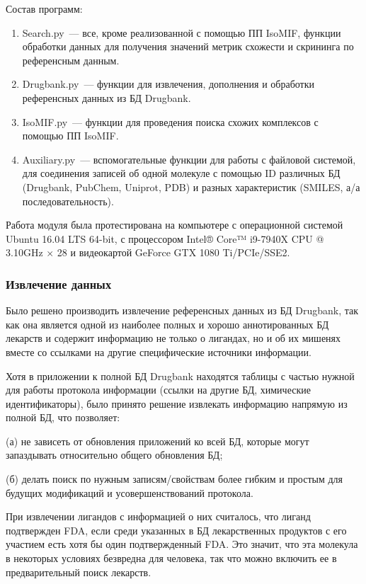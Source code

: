 \documentclass[a4paper,14pt]{article}         %
\begin{document}
Состав программ:
\begin{enumerate}
	\item Search.py~--- все, кроме реализованной с помощью ПП IsoMIF, функции обработки данных для получения значений метрик схожести и скрининга по референсным данным.
	\item Drugbank.py~--- функции для извлечения, дополнения и обработки референсных данных из БД Drugbank.
	\item IsoMIF.py~--- функции для проведения поиска схожих комплексов с помощью ПП IsoMIF.
	\item Auxiliary.py~--- вспомогательные функции для работы с файловой системой, для соединения записей об одной молекуле с помощью ID различных БД (Drugbank, PubChem, Uniprot, PDB) и разных характеристик (SMILES, а/а последовательность).
\end{enumerate}

Работа модуля была протестирована на компьютере с операционной системой Ubuntu 16.04 LTS 64-bit, с процессором Intel® Core™ i9-7940X CPU @ 3.10GHz $\times$ 28 и видеокартой GeForce GTX 1080 Ti/PCIe/SSE2.
\subsubsection{Извлечение данных}
Было решено производить извлечение референсных данных из БД Drugbank, так как она является одной из наиболее полных и хорошо аннотированных БД лекарств \cite{Wishart2017} и содержит информацию не только о лигандах, но и об их мишенях вместе со ссылками на другие специфические источники информации. 

Хотя в приложении к полной БД Drugbank находятся таблицы с частью нужной для работы протокола информации (ссылки на другие БД, химические идентификаторы), было принято решение извлекать информацию напрямую из полной БД, что позволяет: 

(а) не зависеть от обновления приложений ко всей БД, которые могут запаздывать относительно общего обновления БД; 

(б) делать поиск по нужным записям/свойствам более гибким и простым для будущих модификаций и усовершенствований протокола.

При извлечении лигандов с информацией о них считалось, что лиганд подтвержден FDA, если среди указанных в БД лекарственных продуктов с его участием есть хотя бы один подтвержденный FDA. Это значит, что эта молекула в некоторых условиях безвредна для человека, так что можно включить ее в предварительный поиск лекарств. 
\end{document}
